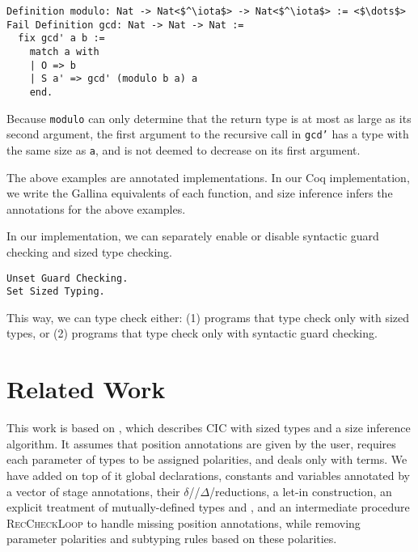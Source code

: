 \documentclass[sigplan,10pt,anonymous,review]{acmart}
\begin{document}
\begin{verbatim}
Definition modulo: Nat -> Nat<$^\iota$> -> Nat<$^\iota$> := <$\dots$>
Fail Definition gcd: Nat -> Nat -> Nat :=
  fix gcd' a b :=
    match a with
    | O => b
    | S a' => gcd' (modulo b a) a
    end.
\end{verbatim}

Because \texttt{modulo} can only determine that the return type is at most as large as its second argument, the first argument to the recursive call in \texttt{gcd'} has a type with the same size as \texttt{a}, and is not deemed to decrease on its first argument.

The above examples are annotated \lang implementations.
In our Coq implementation, we write the Gallina equivalents of each function,
and size inference infers the annotations for the above examples.

In our implementation, we can separately enable or disable syntactic
guard checking and sized type checking.

\begin{verbatim}
Unset Guard Checking.
Set Sized Typing.
\end{verbatim}

This way, we can type check either: (1) programs that type check only with sized
types, or (2) programs that type check only with syntactic guard checking.

\section{Related Work}\label{related}

This work is based on \CIChat \cite{cic-hat}, which describes CIC with sized types and a size inference algorithm. It assumes that position annotations are given by the user, requires each parameter of \coinductive types to be assigned polarities, and deals only with terms. We have added on top of it global declarations, constants and variables annotated by a vector of stage annotations, their $\delta$\-//$\Delta$\-/reductions, a let-in construction, an explicit treatment of mutually-defined \coinductive types and \cofixpoints, and an intermediate procedure \textsc{RecCheckLoop} to handle missing position annotations, while removing parameter polarities and subtyping rules based on these polarities.
\end{document}

